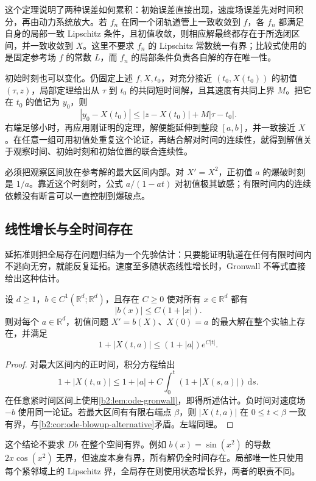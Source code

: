 这个定理说明了两种误差如何累积：初始误差直接出现，速度场误差先对时间积分，再由动力系统放大。若 \(f_n\) 在同一个闭轨道管上一致收敛到 \(f\)，各 \(f_n\) 都满足自身的局部一致 Lipschitz 条件，且初值收敛，则相应解最终都存在于所选闭区间，并一致收敛到 \(X\)。这里不要求 \(f_n\) 的 Lipschitz 常数统一有界；比较式使用的是固定参考场 \(f\) 的常数 \(L\)，而 \(f_n\) 的局部条件负责各自解的存在唯一性。

\ProseParagraphBreak
初始时刻也可以变化。仍固定上述 \(f,X,t_0\)，对充分接近 \((t_0,X(t_0))\) 的初值 \((\tau,z)\)，局部定理给出从 \(\tau\) 到 \(t_0\) 的共同短时间解，且其速度有共同上界 \(M\)。把它在 \(t_0\) 的值记为 \(y_0\)，则
\[
 |y_0-X(t_0)|\leq |z-X(t_0)|+M|\tau-t_0|.
\]
右端足够小时，再应用刚证明的定理，解便能延伸到整段 \([a,b]\)，并一致接近 \(X\)。在任意一组可用初值处重复这个论证，再结合解对时间的连续性，就得到解值关于观察时间、初始时刻和初始位置的联合连续性。

\ProseParagraphBreak
必须把观察区间放在参考解的最大区间内部。对 \(X'=X^2\)，正初值 \(a\) 的爆破时刻是 \(1/a\)。靠近这个时刻时，公式 \(a/(1-at)\) 对初值极其敏感；有限时间内的连续依赖没有断言可以一直控制到爆破点。

\subsection{线性增长与全时间存在}
\label{b2:subsec:ode-linear-growth}

延拓准则把全局存在问题归结为一个先验估计：只要能证明轨道在任何有限时间内不逃向无穷，就能反复延拓。速度至多随状态线性增长时，Gronwall 不等式直接给出这种估计。

\begin{proposition}\label{b2:prop:ode-linear-growth}
设 \(d\geq1\)，\(b\in C^1(\mathbb R^d;\mathbb R^d)\)，且存在 \(C\geq0\) 使对所有 \(x\in\mathbb R^d\) 都有
\[
 |b(x)|\leq C(1+|x|).
\]
则对每个 \(a\in\mathbb R^d\)，初值问题 \(X'=b(X)\)、\(X(0)=a\) 的最大解在整个实轴上存在，并满足
\[
 1+|X(t,a)|\leq(1+|a|)e^{C|t|}.
\]
\end{proposition}
\begin{proof}
对最大区间内的正时间，积分方程给出
\[
 1+|X(t,a)|\leq1+|a|+C\int_0^t(1+|X(s,a)|)\,\mathrm ds.
\]
在任意紧时间区间上使用\cref{b2:lem:ode-gronwall}，即得所述估计。负时间对速度场 \(-b\) 使用同一论证。若最大区间有有限右端点 \(\beta\)，则 \(|X(t,a)|\) 在 \(0\leq t<\beta\) 一致有界，与\cref{b2:cor:ode-blowup-alternative}矛盾。左端同理。
\end{proof}

这个结论不要求 \(Db\) 在整个空间有界。例如 \(b(x)=\sin(x^2)\) 的导数 \(2x\cos(x^2)\) 无界，但速度本身有界，所有解仍全时间存在。局部唯一性只使用每个紧邻域上的 Lipschitz 界，全局存在则使用状态增长界，两者的职责不同。

